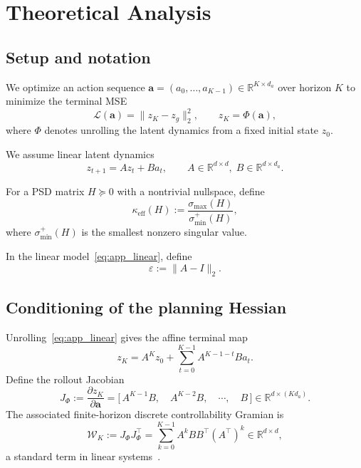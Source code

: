 \section{Theoretical Analysis}

\subsection{Setup and notation}
We optimize an action sequence $\mathbf a=(a_0,\dots,a_{K-1})\in\mathbb{R}^{K\times d_a}$ over horizon $K$
to minimize the terminal MSE
\begin{equation}\label{eq:app_obj}
\mathcal L(\mathbf a)=\|z_K-z_g\|_2^2,\qquad z_K=\Phi(\mathbf a),
\end{equation}
where $\Phi$ denotes unrolling the latent dynamics from a fixed initial state $z_0$.

\begin{assumption}\label{as:app_linear}
We assume linear latent dynamics
\begin{equation}\label{eq:app_linear}
z_{t+1}=Az_t+Ba_t,\qquad A\in\mathbb{R}^{d\times d},\; B\in\mathbb{R}^{d\times d_a}.
\end{equation}
\end{assumption}

\begin{definition}\label{def:app_keff}
For a PSD matrix $H\succeq 0$ with a nontrivial nullspace, define
\[
\kappa_{\mathrm{eff}}(H):=\frac{\sigma_{\max}(H)}{\sigma_{\min}^+(H)},
\]
where $\sigma_{\min}^+(H)$ is the smallest nonzero singular value.
\end{definition}

\begin{definition}\label{def:app_eps}
In the linear model~\eqref{eq:app_linear}, define
\[
\varepsilon:=\|A-I\|_2.
\]
\end{definition}

\subsection{Conditioning of the planning Hessian}
\label{app:theory_hessian}

Unrolling~\eqref{eq:app_linear} gives the affine terminal map
\begin{equation}\label{eq:app_unroll}
z_K
=
A^{K} z_0 + \sum_{t=0}^{K-1} A^{K-1-t} B a_t.
\end{equation}
Define the rollout Jacobian
\begin{equation}\label{eq:app_Jphi}
J_\Phi
:=
\frac{\partial z_K}{\partial \mathbf a}
=
\bigl[\,A^{K-1}B,\quad A^{K-2}B,\quad \cdots,\quad B\,\bigr]
\in\mathbb{R}^{d\times (K d_a)}.
\end{equation}
The associated finite-horizon discrete controllability Gramian is
\begin{equation}\label{eq:app_gram}
\mathcal W_K
:=
J_\Phi J_\Phi^\top
=
\sum_{k=0}^{K-1} A^k B B^\top (A^\top)^k\in\mathbb{R}^{d\times d},
\end{equation}
a standard term in linear systems~\citep{kailath1980linear,sontag1998mathematical,chen1999linear}.

